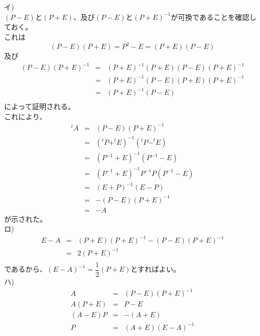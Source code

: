\documentclass{jsarticle}
\begin{document}
\section{} %
\section{} %
\section{} %
イ)\\
$(P - E)$と$(P + E)$、及び$(P - E)$と$(P + E)^{-1}$が可換であることを確認しておく。\\
これは
\begin{equation*}
	(P - E)(P + E) = P^2 - E = (P + E)(P - E)
\end{equation*}
及び
\begin{eqnarray*}
	(P - E)(P + E)^{-1} &=& (P + E)^{-1} (P + E)(P - E)(P + E)^{-1}\\
	&=& (P + E)^{-1} (P - E)(P + E)(P + E)^{-1}\\
	&=& (P + E)^{-1} (P - E)\\
\end{eqnarray*}
によって証明される。\\
これにより、
\begin{eqnarray*}
	^t A &=& (P - E)(P + E)^{-1}\\
	&=& (^t P + ^t E)^{-1} (^t P - ^t E)\\
	&=& (P^{-1} + E)^{-1} (P^{-1} - E)\\
	&=& (P^{-1} + E)^{-1} P^{-1}P(P^{-1} - E)\\
	&=& (E + P)^{-1}(E - P)\\
	&=& -(P - E)(P + E)^{-1}\\
	&=& -A
\end{eqnarray*}
が示された。\\
ロ)\\
\begin{eqnarray*}
	E - A &=& (P + E)(P + E)^{-1} - (P - E)(P + E)^{-1}\\
	&=& 2(P + E)^{-1}\\
\end{eqnarray*}
であるから、$(E - A)^{-1} = \dfrac{1}{2}(P + E)$とすればよい。\\
ハ)\\
\begin{eqnarray*}
	A &=& (P - E)(P + E)^{-1}\\
	A(P + E) &=& P - E\\
	(A - E)P &=& -(A + E)\\
	P &=& (A + E)(E - A)^{-1}\\
\end{eqnarray*}

\section{} %
\end{document}
